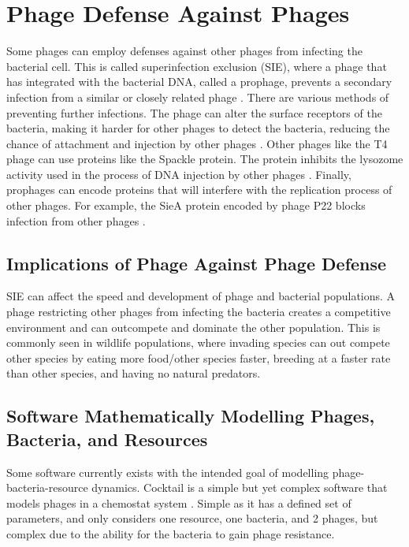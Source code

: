 \section{Phage Defense Against Phages}
Some phages can employ defenses against other phages from infecting the bacterial cell. 
This is called superinfection exclusion (SIE), where a phage that has integrated with the bacterial DNA, called a prophage, prevents a secondary infection from a similar or closely related phage \cite{patelAntiphageDefenceInhibition2024}. 
There are various methods of preventing further infections. 
The phage can alter the surface receptors of the bacteria, making it harder for other phages to detect the bacteria, reducing the chance of attachment and injection by other phages \cite{bucherPhageMachineSIEence2024}. 
Other phages like the T4 phage can use proteins like the Spackle protein. 
The protein inhibits the lysozome activity used in the process of DNA injection by other phages \cite{bucherPhageMachineSIEence2024, kanamaruStructureFunctionT42020}. 
Finally, prophages can encode proteins that will interfere with the replication process of other phages. 
For example, the SieA protein encoded by phage P22 blocks infection from other phages \cite{leavittBacteriophageP22SieAmediated2024}. 

\subsection{Implications of Phage Against Phage Defense}
SIE can affect the speed and development of phage and bacterial populations. A phage restricting other phages from infecting the bacteria creates a competitive environment and can outcompete and dominate the other population. 
This is commonly seen in wildlife populations, where invading species can out compete other species by eating more food/other species faster, breeding at a faster rate than other species, and having no natural predators. 

\subsection{Software Mathematically Modelling Phages, Bacteria, and Resources}
Some software currently exists with the intended goal of modelling phage-bacteria-resource dynamics. 
Cocktail is a simple but yet complex software that models phages in a chemostat system \cite{nilssonCocktailComputerProgram2022}. 
Simple as it has a defined set of parameters, and only considers one resource, one bacteria, and 2 phages, but complex due to the ability for the bacteria to gain phage resistance. 


